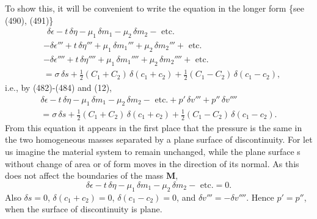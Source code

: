 \documentclass[12pt]{memoir}
\newcommand{\dd}{\delta}
\begin{document}
{To show this, it will be convenient to write the equation in the
longer form \{see (490), (491)\}
\begin{align}
&\ \  \dd \epsilon - t \, \dd \eta- \mu_1 \, \dd m_1 - \mu_2 \, \dd m_2 - \text{ etc.} \nonumber \\
&- \dd \epsilon''' + t \, \dd \eta'''+ \mu_1 \, \dd m_1''' + \mu_2 \, \dd m_2''' + \text{ etc.} \nonumber \\
&- \dd \epsilon'''' + t \, \dd \eta''''+ \mu_1 \, \dd m_1'''' + \mu_2 \, \dd m_2''''+ \text{ etc.} \nonumber \\
&= \sigma \, \dd s + \tfrac{1}{2}(C_1 + C_2)\, \dd (c_1 + c_2)+ \tfrac{1}{2}(C_1 - C_2) \,\dd(c_1 - c_2),  \label{495} \end{align}
i.e., by (482)-(484) and (12),
\begin{multline}
\dd \epsilon - t \, \dd \eta- \mu_1 \, \dd m_1 - \mu_2 \, \dd m_2 - \text{ etc.} +p' \, \dd v''' +p''\, \dd v'''' \\
=  \sigma \, \dd s + \tfrac{1}{2}(C_1 + C_2)\, \dd (c_1 + c_2)+ \tfrac{1}{2}(C_1 - C_2) \,\dd(c_1 - c_2).  \label{496} \end{multline}
From this equation it appears in the first place that the pressure is the same in the two homogeneous masses separated by a plane surface of discontinuity. For let us imagine the material system to remain unchanged, while the plane surface s without change of area or of form moves in the direction of its normal. As this does not affect the boundaries of the mass $\mathbf{M}$,
$$\dd \epsilon - t \, \dd \eta- \mu_1 \, \dd m_1 - \mu_2 \, \dd m_2 - \text{ etc.} =0.$$
Also $\delta s = 0$, $\delta (c_1 + c_2) = 0$, $\delta (c_1 - c_2) = 0$, and $\delta v''' = - \delta v''''$. Hence $p' =p''$, when the surface of discontinuity is plane.


}
\end{document}
